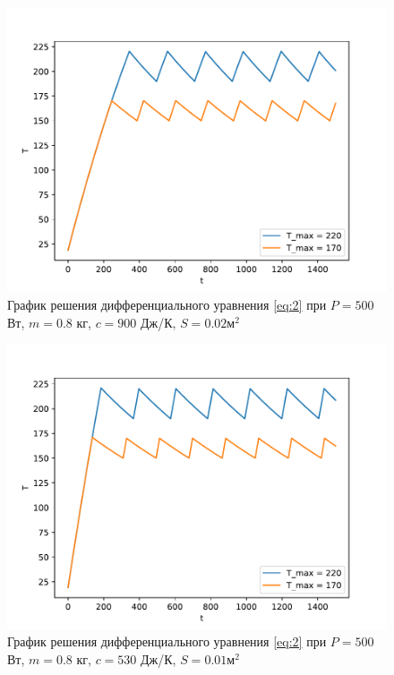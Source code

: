 \documentclass[a4paper, 14pt]{extarticle}
\begin{document}
			\begin{figure}[H]
				\centering
				\includegraphics[width = \linewidth]{fig3.pdf}
				\caption[.] {График решения дифференциального уравнения \eqref{eq:2} 
					при $P = 500$ Вт, $m = 0.8$ кг, $c = 900$ Дж/К, $S = 0.02 \text{м}^2$ }
			\end{figure}
			
			\begin{figure}[H]
				\centering
				\includegraphics[width = \linewidth]{fig4.pdf}
				\caption[.] {График решения дифференциального уравнения \eqref{eq:2} 
					при $P = 500$ Вт, $m = 0.8$ кг, $c = 530$ Дж/К, $S = 0.01 \text{м}^2$}
			\end{figure}
			
\end{document}
